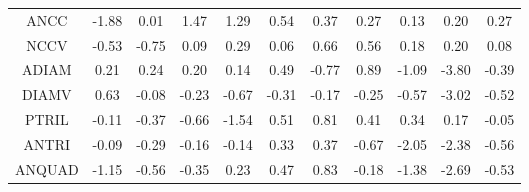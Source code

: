 \begin{longtable}{ | c || c | c | c | c | c | c | c | c | c || c |}
ANCC &  \cellcolor[HTML]{FFCFCF} -1.88 &  \cellcolor[HTML]{FFFFFF} 0.01 &  \cellcolor[HTML]{D7D7FF} 1.47 &  \cellcolor[HTML]{DFDFFF} 1.29 &  \cellcolor[HTML]{EFEFFF} 0.54 &  \cellcolor[HTML]{F7F7FF} 0.37 &  \cellcolor[HTML]{F7F7FF} 0.27 &  \cellcolor[HTML]{FFFFFF} 0.13 &  \cellcolor[HTML]{F7F7FF} 0.20 &  \cellcolor[HTML]{F7F7FF} 0.27 \\
NCCV &  \cellcolor[HTML]{FFEFEF} -0.53 &  \cellcolor[HTML]{FFEFEF} -0.75 &  \cellcolor[HTML]{FFFFFF} 0.09 &  \cellcolor[HTML]{F7F7FF} 0.29 &  \cellcolor[HTML]{FFFFFF} 0.06 &  \cellcolor[HTML]{EFEFFF} 0.66 &  \cellcolor[HTML]{EFEFFF} 0.56 &  \cellcolor[HTML]{F7F7FF} 0.18 &  \cellcolor[HTML]{F7F7FF} 0.20 &  \cellcolor[HTML]{FFFFFF} 0.08 \\
ADIAM &  \cellcolor[HTML]{F7F7FF} 0.21 &  \cellcolor[HTML]{F7F7FF} 0.24 &  \cellcolor[HTML]{F7F7FF} 0.20 &  \cellcolor[HTML]{FFFFFF} 0.14 &  \cellcolor[HTML]{EFEFFF} 0.49 &  \cellcolor[HTML]{FFEFEF} -0.77 &  \cellcolor[HTML]{E7E7FF} 0.89 &  \cellcolor[HTML]{FFE7E7} -1.09 &  \cellcolor[HTML]{FF9F9F} -3.80 &  \cellcolor[HTML]{FFF7F7} -0.39 \\
DIAMV &  \cellcolor[HTML]{EFEFFF} 0.63 &  \cellcolor[HTML]{FFFFFF} -0.08 &  \cellcolor[HTML]{FFF7F7} -0.23 &  \cellcolor[HTML]{FFEFEF} -0.67 &  \cellcolor[HTML]{FFF7F7} -0.31 &  \cellcolor[HTML]{FFF7F7} -0.17 &  \cellcolor[HTML]{FFF7F7} -0.25 &  \cellcolor[HTML]{FFEFEF} -0.57 &  \cellcolor[HTML]{FFAFAF} -3.02 &  \cellcolor[HTML]{FFEFEF} -0.52 \\
PTRIL &  \cellcolor[HTML]{FFFFFF} -0.11 &  \cellcolor[HTML]{FFF7F7} -0.37 &  \cellcolor[HTML]{FFEFEF} -0.66 &  \cellcolor[HTML]{FFD7D7} -1.54 &  \cellcolor[HTML]{EFEFFF} 0.51 &  \cellcolor[HTML]{E7E7FF} 0.81 &  \cellcolor[HTML]{F7F7FF} 0.41 &  \cellcolor[HTML]{F7F7FF} 0.34 &  \cellcolor[HTML]{F7F7FF} 0.17 &  \cellcolor[HTML]{FFFFFF} -0.05 \\
ANTRI &  \cellcolor[HTML]{FFFFFF} -0.09 &  \cellcolor[HTML]{FFF7F7} -0.29 &  \cellcolor[HTML]{FFF7F7} -0.16 &  \cellcolor[HTML]{FFFFFF} -0.14 &  \cellcolor[HTML]{F7F7FF} 0.33 &  \cellcolor[HTML]{F7F7FF} 0.37 &  \cellcolor[HTML]{FFEFEF} -0.67 &  \cellcolor[HTML]{FFCFCF} -2.05 &  \cellcolor[HTML]{FFC7C7} -2.38 &  \cellcolor[HTML]{FFEFEF} -0.56 \\
ANQUAD &  \cellcolor[HTML]{FFDFDF} -1.15 &  \cellcolor[HTML]{FFEFEF} -0.56 &  \cellcolor[HTML]{FFF7F7} -0.35 &  \cellcolor[HTML]{F7F7FF} 0.23 &  \cellcolor[HTML]{F7F7FF} 0.47 &  \cellcolor[HTML]{E7E7FF} 0.83 &  \cellcolor[HTML]{FFF7F7} -0.18 &  \cellcolor[HTML]{FFDFDF} -1.38 &  \cellcolor[HTML]{FFBFBF} -2.69 &  \cellcolor[HTML]{FFEFEF} -0.53 \\

\end{longtable}
